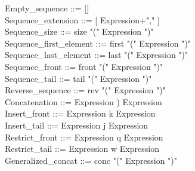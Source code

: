 \documentclass[12pt,a4paper,draft]{article}
\begin{document}
{\begin{sloppypar}
Empty\_sequence    ::= [] \\
Sequence\_extension  ::= [ Expression+"," ] \\
Sequence\_size   ::= size "(" Expression ")" \\
Sequence\_first\_element  ::= first "(" Expression ")" \\
Sequence\_last\_element  ::= last "(" Expression ")" \\
Sequence\_front    ::= front "(" Expression ")" \\
Sequence\_tail    ::= tail "(" Expression ")" \\
Reverse\_sequence   ::= rev "(" Expression ")" \\
Concatenation   ::=  Expression ) Expression \\
Insert\_front    ::=  Expression k Expression \\
Insert\_tail    ::=  Expression j Expression \\
Restrict\_front   ::=  Expression q Expression \\
Restrict\_tail    ::=  Expression w Expression \\
Generalized\_concat  ::= conc "(" Expression ")" \\ 
\end{sloppypar} 
}
\end{document}
